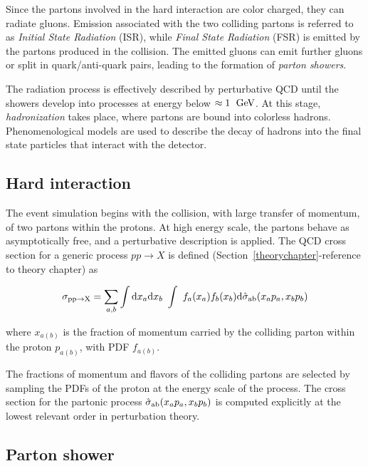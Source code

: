 Since the partons involved in the hard interaction are color charged,
they can radiate gluons. Emission associated with the two colliding partons  
is referred to as {\it Initial State Radiation} (ISR), while {\it
  Final State Radiation} (FSR) is emitted by the partons produced in
the collision. The emitted gluons can emit further gluons or split in
quark/anti-quark pairs, leading to the formation of {\it parton
  showers}.

The radiation process is effectively described by perturbative QCD until
the showers develop into processes at energy below
$\approx{}1~\; \mathrm{GeV}{}$. 
At this stage, {\it hadronization} takes place, where partons are
bound into colorless hadrons. Phenomenological models are used to
describe the decay of hadrons into the final state particles that
interact with the detector.

\subsection{Hard interaction}
\label{sec:hardinteraction}

The event simulation begins with the collision, with large transfer of
momentum, of two partons within the protons. At high energy scale, the
partons behave as asymptotically free, and a perturbative description
is applied. The QCD cross section for a generic process $pp\to X$ is
defined (Section~\ref{theorychapter}-reference to theory chapter) as

\begin{equation}
  \sigma_{{\rm pp}\to{\rm X}}
  = \sum_{a,b}
  \int{\rm d}x_a{\rm d}x_b
  ~ \int
  ~ f_a(x_a) f_b(x_b)
  {\rm d}\hat{\sigma}_{\rm ab}(x_ap_a, x_bp_b) \\
  \label{eq:qcdxsec}
\end{equation}

where $x_{a(b)}$ is the fraction of momentum carried by the colliding
parton within the proton $p_{a(b)}$, with PDF $f_{a(b)}$.

The fractions of momentum and flavors of the colliding partons are
selected by sampling the PDFs of the proton at the energy scale of the
process. The cross section for the partonic process $\hat{\sigma}_{\rm
  ab}(x_ap_a, x_bp_b)$ is computed explicitly at the lowest relevant
order in perturbation theory.

\subsection{Parton shower}
\label{sec:partonshower}

